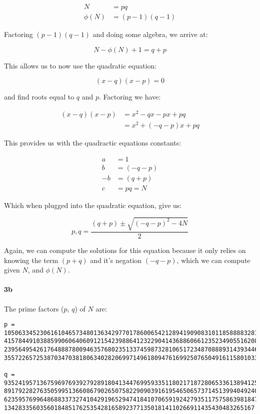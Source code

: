 \documentclass[12pt]{article}
\begin{document}
\begin{align*}
    N &= pq \\
    \phi{(N)} &= (p - 1)(q - 1)
\end{align*}

Factoring $(p - 1)(q - 1)$ and doing some algebra, we arrive at:

\[
    N - \phi{(N)} + 1 = q + p
\]

This allows us to now use the quadratic equation:

\[
    (x - q)(x - p) = 0
\]

and find roots equal to $q$ and $p$. Factoring we have:

\begin{align*}
    (x - q)(x - p) &= x^2 - qx - px + pq \\
    &= x^2 + (-q - p)x + pq
\end{align*}

This provides us with the quadractic equations constants:

\begin{align*}
    a &= 1 \\
    b &= (-q - p) \\
   -b &= (q + p) \\
    c &= pq = N
\end{align*}

Which when plugged into the quadratic equation, give us:

\[
    p,q = \frac{(q + p) \pm \sqrt{(-q-p)^2-4N}}{2}
\]

Again, we can compute the solutions for this equation because it only
relies on knowing the term $(p + q)$ and it's negation $(-q - p)$, which
we can compute given $N$, and $\phi{(N)}$.

\paragraph{3b}

The prime factors ($p$, $q$) of $N$ are:

\begin{verbatim}
p = 
1050633452306161046573480136342977017860065421289419090831011858888328139819275
4157844910388599060640609121542398864123229041436886066123523490551620883141000
2395649542617648887800946357680235133745987328106517234870888931439344639465469
355722657253870347038180634028206997149618094761699250765049161158010333

q =
9352419571367596976939279289180413447699593351180217187280653361389412531812702
8917922827635059951366086790265075822909039161954650657371451399404924083352681
6235957699648688337327410429196529474184107065919242793511757586398184746028719
1342833560356018485176253542816589237713501814110266911435430483265167
\end{verbatim}
\end{document}
